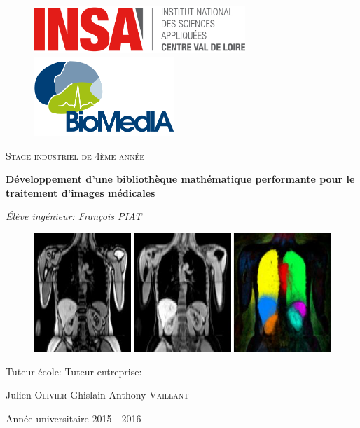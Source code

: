 \documentclass[10pt]{report}
\begin{document}
\begin{titlepage}	
	\flushleft
	\begin{figure}[!h]
		\includegraphics[height=1.8cm]{Reports/figures/logo_insa_cvl.png}
		\hfill
		\includegraphics[height=3cm]{Reports/figures/logo_biomedia.png}
	\end{figure}
	\centering
	\vspace{2cm}
	{\scshape\Large Stage industriel de 4ème année\par}
	\vspace{1.5cm}
	{\huge\bfseries Développement d'une bibliothèque mathématique performante pour le traitement d'images médicales\par}
	\vspace{2cm}
	{\Large\itshape Élève ingénieur: François PIAT\par}
		\vspace{1cm}
	\begin{figure}[!h]
		\begin{center}
			\includegraphics[width=13cm]{Reports/figures/biomedia_image.png}
		\end{center}
	\end{figure}
	\vfill
	\flushleft
	Tuteur école: \hfill Tuteur entreprise: \par
	Julien \textsc{Olivier} \hfill Ghislain-Anthony \textsc{Vaillant}
	\vfill
	\centering
	{\large Année universitaire 2015 - 2016 \par}
\end{titlepage}
\end{document}
